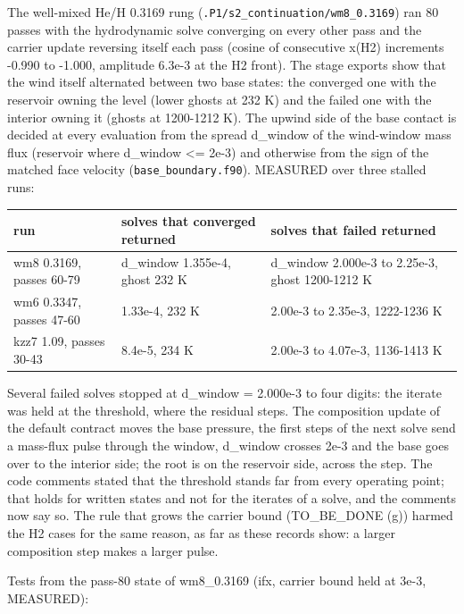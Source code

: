 \documentclass[english,a4paper]{my_memo}
\begin{document}
The well-mixed He/H 0.3169 rung (\texttt{.P1/s2\_continuation/wm8\_0.3169}) ran 80
passes with the hydrodynamic solve converging on every other pass and the
carrier update reversing itself each pass (cosine of consecutive x(H2)
increments -0.990 to -1.000, amplitude 6.3e-3 at the H2 front). The stage
exports show that the wind itself alternated between two base states: the
converged one with the reservoir owning the level (lower ghosts at 232 K)
and the failed one with the interior owning it (ghosts at 1200-1212 K).
The upwind side of the base contact is decided at every evaluation from the
spread d\_window of the wind-window mass flux (reservoir where
d\_window \textless= 2e-3) and otherwise from the sign of the matched face velocity
(\texttt{base\_boundary.f90}). MEASURED over three stalled runs:

{\def\LTcaptype{none} %
{\small
\begin{longtable}[]{@{}lll@{}}
\toprule\noalign{}
run & solves that converged returned & solves that failed returned \\
\midrule\noalign{}
\endhead
\bottomrule\noalign{}
\endlastfoot
wm8 0.3169, passes 60-79 & d\_window 1.355e-4, ghost 232 K & d\_window 2.000e-3 to 2.25e-3, ghost 1200-1212 K \\
wm6 0.3347, passes 47-60 & 1.33e-4, 232 K & 2.00e-3 to 2.35e-3, 1222-1236 K \\
kzz7 1.09, passes 30-43 & 8.4e-5, 234 K & 2.00e-3 to 4.07e-3, 1136-1413 K \\
\end{longtable}
}
}

Several failed solves stopped at d\_window = 2.000e-3 to four digits: the
iterate was held at the threshold, where the residual steps. The composition
update of the default contract moves the base pressure, the first steps of
the next solve send a mass-flux pulse through the window, d\_window crosses
2e-3 and the base goes over to the interior side; the root is on the
reservoir side, across the step. The code comments stated that the
threshold stands far from every operating point; that holds for written
states and not for the iterates of a solve, and the comments now say so.
The rule that grows the carrier bound (TO\_BE\_DONE (g)) harmed the H2 cases
for the same reason, as far as these records show: a larger composition
step makes a larger pulse.

Tests from the pass-80 state of wm8\_0.3169 (ifx, carrier bound held at
3e-3, MEASURED):
\end{document}
